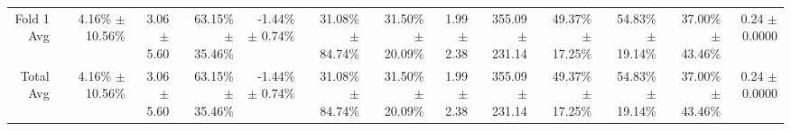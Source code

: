 \begin{table}[H]
{\begin{tabular}{rrrrrrrrrrrrrr}
\midrule
\midrule
Fold 1 Avg &  & \shortstack{4.16\% \\ $\pm$ 10.56\%} & \shortstack{3.06 \\ $\pm$ 5.60} & \shortstack{63.15\% \\ $\pm$ 35.46\%} & \shortstack{-1.44\% \\ $\pm$ 0.74\%} & \shortstack{31.08\% \\ $\pm$ 84.74\%} & \shortstack{31.50\% \\ $\pm$ 20.09\%} & \shortstack{1.99 \\ $\pm$ 2.38} & \shortstack{355.09 \\ $\pm$ 231.14} & \shortstack{49.37\% \\ $\pm$ 17.25\%} & \shortstack{54.83\% \\ $\pm$ 19.14\%} & \shortstack{37.00\% \\ $\pm$ 43.46\%} & \shortstack{0.24 \\ $\pm$ 0.0000} \\
Total Avg &  & \shortstack{4.16\% \\ $\pm$ 10.56\%} & \shortstack{3.06 \\ $\pm$ 5.60} & \shortstack{63.15\% \\ $\pm$ 35.46\%} & \shortstack{-1.44\% \\ $\pm$ 0.74\%} & \shortstack{31.08\% \\ $\pm$ 84.74\%} & \shortstack{31.50\% \\ $\pm$ 20.09\%} & \shortstack{1.99 \\ $\pm$ 2.38} & \shortstack{355.09 \\ $\pm$ 231.14} & \shortstack{49.37\% \\ $\pm$ 17.25\%} & \shortstack{54.83\% \\ $\pm$ 19.14\%} & \shortstack{37.00\% \\ $\pm$ 43.46\%} & \shortstack{0.24 \\ $\pm$ 0.0000} \\
\bottomrule
\end{tabular}}
\end{table}
